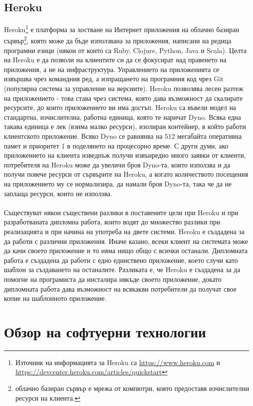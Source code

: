 \documentclass[pdftex,14pt,a4paper]{extreport}
\begin{document}
\subsection {Heroku}
Heroku\footnote{Източник на информацията за Heroku са \url{https://www.heroku.com} и \\\url{https://devcenter.heroku.com/articles/quickstart}} е платформа за хостване на Интернет приложения на облачно базиран сървър\footnote{облачно базиран сървър е мрежа от компютри, която предоставя изчислителни ресурси на клиента.}, която може да бъде използвана за приложения, написани на редица програмни езици (някои от които са Ruby, Clojure, Python, Java и Scala). Целта на Heroku е да позволи на клиентите си да се фокусират над правенето на приложения, а не на инфраструктура. Управлението на приложенията се извършва чрез командния ред, а изпращането на програмния код чрез Git (популярна система за управление на версиите). Heroku позволява лесен разтеж на приложението - това става чрез система, която дава възможност да скалирате ресурсите, до които приложението ви има достъп. Heroku са въвели модел на стандартна, изчислителна, работна единица, която те наричат Dyno. Всяка една такава единица е лек (взима малко ресурси), изолиран контейнер, в който работи клиентското приложение. Всяко Dyno се равнянва на 512 мегабайта оперативна памет и приоритет 1 в поделянето на процесорно време. С други думи, ако приложението на клиента изведнъж получи извънредно много заявки от клиенти, потребителя на Heroku може да увеличи броя Dyno-та, които използва и да получи повече ресурси от сървърите на Heroku, а когато количеството посещения на приложението му се нормализира, да намали броя Dyno-та, така че да не заплаща ресурси, които не използва.\\\\
Съществуват някои съществени разлики в поставените цели при Heroku и при разработваната дипломна работа, които водят до множество разлики при реализацията и при начина на употреба на двете системи. Heroku е създадена за да работи с различни приложения. Иначе казано, всеки клиент на системата може да качи своето приложение и то няма нищо общо с всички останали. Дипломната работа е създадена да работи с едно единствено приложение, което случи като шаблон за създаването на останалите. Разликата е, че Heroku е създадена за да помогне на програмиста да инсталира някъде своето приложение, докато дипломната работа дава възможност на всякакви потребители да получат свое копие на шаблонното приложение.
\section {Обзор на софтуерни технологии}
\end{document}
